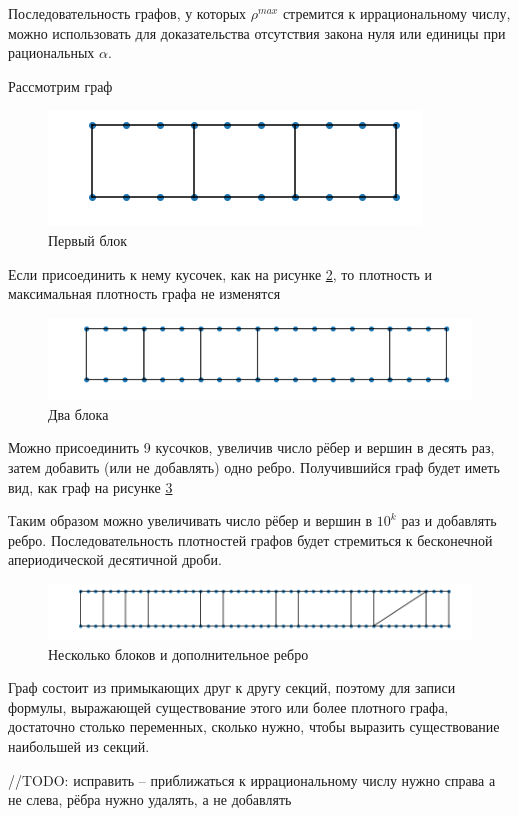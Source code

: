 Последовательность графов, у которых $\rho^{max}$ стремится к иррациональному числу, можно использовать для доказательства отсутствия закона нуля или единицы при рациональных $\alpha$.

Рассмотрим граф
\begin{figure}[h]
  \centering
  \includegraphics[scale=0.5]{picrel/first_block.png}
  \caption{Первый блок}
  \label{fig:first block}
\end{figure}

Если присоединить к нему кусочек, как на рисунке \ref{fig:2 blocks}, то плотность и максимальная плотность графа не изменятся

\begin{figure}[h]
  \centering
  \includegraphics[scale=0.5]{picrel/2_blocks.png}
  \caption{Два блока}
  \label{fig:2 blocks}
\end{figure}

Можно присоединить 9 кусочков, увеличив число рёбер и 
вершин в десять раз, затем добавить (или не добавлять) одно ребро. Получившийся граф будет иметь вид, как граф на рисунке \ref{fig:additional edge}

Таким образом можно увеличивать число рёбер и вершин в $10^k$ раз и добавлять ребро.
Последовательность плотностей графов будет стремиться к бесконечной апериодической десятичной дроби.

\begin{figure}[ht]
  \includegraphics[scale=0.5]{picrel/additional_edge.png}
  \caption{Несколько блоков и дополнительное ребро}
  \label{fig:additional edge}
\end{figure}

Граф состоит из примыкающих друг к другу секций, поэтому для записи формулы, выражающей существование этого или более плотного графа, достаточно столько переменных, сколько нужно, чтобы выразить существование наибольшей из секций. 

//TODO: исправить -- приближаться к иррациональному числу нужно справа а не слева, рёбра нужно удалять, а не добавлять